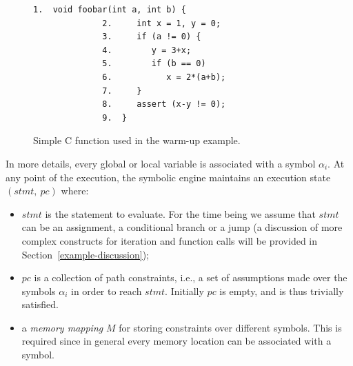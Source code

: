 
\begin{figure}[t]
\begin{lstlisting}[basicstyle=\ttfamily\small]
              1.  void foobar(int a, int b) {
              2.     int x = 1, y = 0;
              3.     if (a != 0) {
              4.        y = 3+x;
              5.        if (b == 0)
              6.           x = 2*(a+b);
              7.     }
              8.     assert (x-y != 0);
              9.  }
\end{lstlisting}
\caption{Simple C function used in the warm-up example.}
\label{fig:example-1}
\end{figure}

In more details, every global or local variable is associated with a symbol $\alpha_i$.  At any point of the execution, the symbolic engine maintains an execution state $(stmt,~pc)$ where:

\begin{itemize}
  \item $stmt$ is the statement to evaluate. For the time being we assume that $stmt$ can be an assignment, a conditional branch or a jump (a discussion of more complex constructs for iteration and function calls will be provided in Section~\ref{example-discussion});
  \item $pc$ is a collection of path constraints, i.e., a set of assumptions made over the symbols $\alpha_i$ in order to reach $stmt$. Initially $pc$ is empty, and is thus trivially satisfied.

\item a {\em memory mapping} $M$ for storing constraints over different symbols. This is required since in general every memory location can be associated with a symbol.
\end{itemize}

